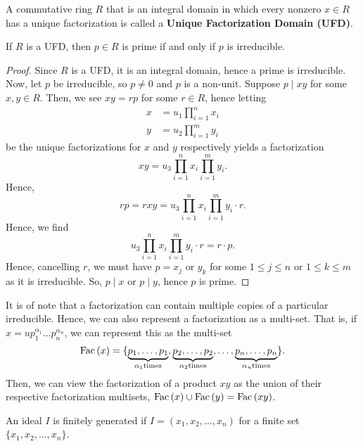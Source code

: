 \begin{definition}
	A commutative ring \(R\) that is an integral domain in which every nonzero \(x \in R\) 	has a unique factorization is called a \textbf{Unique Factorization Domain (UFD)}.
\end{definition}

\begin{theorem}
	If \(R \) is a UFD, then  \(p \in R\)   is prime if and only if \(p\) is irreducible.
\end{theorem}
\begin{proof}
	Since \(R\) is a UFD, it is an integral domain, hence a prime is irreducible.\\
	Now, let \(p\) be irreducible, so \(p \neq 0\) and \(p\) is a non-unit. Suppose \(p \mid xy\) for some \(x,y \in R\). Then, we see \(xy = rp\) for some \(r \in R\), hence letting
	\begin{align*}
		x &= u_1 \prod_{i= 1}^{n} x_{i}   \\
		y&= u_2 \prod_{i= 1}^{m} y_{i}
	\end{align*} be the unique factorizations for \(x\) and \(y\) respectively yields a factorization \[
	xy = u_3 \prod_{i= 1}^{n} x_{i} \prod_{i= 1}^{m} y_{i}
	.\]
	Hence, \[
	rp = rxy = u_3 \prod_{i= 1}^{n} x_{i} \prod_{i= 1}^{m} y_{i} \cdot r
	.\]
	Hence, we find \[
	u_3 \prod_{i= 1}^{n} x_{i} \prod_{i= 1}^{m} y_{i}  \cdot r = r \cdot p
	.\]
	Hence, cancelling \(r\),  we must have \(p= x_{j}\) or \(y_{k}\) for some \(1 \le j \le n\) or \(1 \le k \le m\) as it is irreducible. So, \(p \mid x\) or \(p \mid y\), hence \(p\) is prime.
\end{proof}
It is of note that a factorization can contain multiple copies of a particular irreducible. Hence, we can also represent a factorization as a multi-set. That is, if \(x = u p_1^{\alpha_1} \ldots p_{n}^{\alpha_{n}}\), we can represent this as the multi-set \[
	\operatorname{Fac}\left( x \right)  = \{\underbrace{p_1, \ldots, p_1}_{\alpha_1 \text{times}} , \underbrace{p_2, \ldots, p_2}_{\alpha_2 \text{times}},  \ldots, \underbrace{p_{n}, \ldots, p_{n}}_{\alpha_{n} \text{times}}  \}
.\]
Then, we can view the factorization of a product \(xy\) as the union of their respective factorization multisets, \(\operatorname{Fac}\left( x \right) \cup \operatorname{Fac}\left( y \right) = \operatorname{Fac}\left( xy \right)  \).
\begin{definition}
	An ideal \(I\)  is finitely generated if \(I = \left( x_1, x_2, \ldots, x_{n} \right) \) for a finite set \(\{x_1, x_2, \ldots, x_{n}\} \).
\end{definition}
